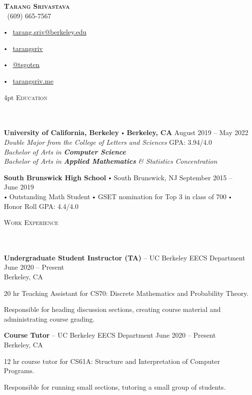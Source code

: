 \documentclass{article}
\newcommand{\contact}[3]{
\vspace*{3pt}
\begin{center}
{\LARGE \scshape {#1}}\\
\vspace{5pt}
#2 
\vspace{2pt}
#3
\end{center}
\vspace*{-8pt}
}
\newcommand{\header}[1]{{
\hspace*{-15pt}\vspace*{6pt} \textsc{#1}} \vspace*{-6pt} 
\lineunder
}
\newcommand{\lineunder}{
\vspace*{-8pt} \\ \hspace*{-18pt} 
\hrulefill \\
}
\newcommand{\school}[5]{\vspace*{2pt}%
\textbf{#1} \labelitemi #2 \hfill #3 \\ #4 \hfill #5
\vspace*{5pt}
}
\newcommand{\college}[7]{
\textbf{#1} \labelitemi \textbf{#2} \hfill #3 \\ #4 \hfill #7 \\ #5 \\ #6 \vspace*{5pt}
}
\newcommand{\employer}[4]{{
\vspace*{2pt}%
\textbf{#1} #2 \hfill #3\\ #4 \vspace*{2pt}}
}
\renewcommand{\labelitemi}{
$\vcenter{\hbox{\tiny$\bullet$}}$\hspace*{3pt}
}
\renewcommand{\labelitemii}{
$\vcenter{\hbox{\tiny$\bullet$}}$\hspace*{-3pt}
}
\newenvironment{bullet-list-minor}{
\begin{list}{\labelitemii}{\setlength\leftmargin{15pt} 
\topsep 0pt \itemsep -2pt}}{\vspace*{4pt}\end{list}
}
\begin{document}
\small
\smallskip
\vspace*{-44pt}

\contact{\textbf{Tarang Srivastava}}
{\faPhone\ (609) 665-7567 
\labelitemi \faEnvelope\ \href{mailto:tarang.sriv@berkeley.edu}{tarang.sriv@berkeley.edu}
\labelitemi \faLinkedin\ \href{https://www.linkedin.com/in/tarangsriv/}{tarangsriv}
\labelitemi \faGithub\ \href{https://github.com/tsgoten}{@tsgoten}%
\labelitemi \faLink\ \href{http://tarangsriv.me}{tarangsriv.me}
}

\vspace{4pt}
\header{Education}
    \college{University of California, Berkeley}{Berkeley, CA}{August 2019 -- May 2022}
    {\textit{Double Major from the College of Letters and Sciences}}
    {\textit{Bachelor of Arts in \textbf{Computer Science}}}
    {\textit{Bachelor of Arts in \textbf{Applied Mathematics} \& Statistics Concentration}}
    {GPA: 3.94/4.0}

    \school{South Brunswick High School}{South Brunswick, NJ}{September 2015 -- June 2019}
    {\labelitemi Outstanding Math Student \labelitemi GSET nomination for Top 3 in class of 700 \labelitemi Honor Roll}
    {GPA: 4.4/4.0}

\vspace*{4pt}%
\header{Work Experience}

    \employer{Undergraduate Student Instructor (TA)}
    {-- UC Berkeley EECS Department}{June 2020 -- Present}{Berkeley, CA}
	\begin{bullet-list-minor}
	\item 20 hr Teaching Assistant for CS70: Discrete Mathematics and Probability Theory. 
	\item Responsible for heading discussion sections, creating course material and administrating course grading.  
    \end{bullet-list-minor}

    \employer{Course Tutor}
    {-- UC Berkeley EECS Department}{June 2020 -- Present}{Berkeley, CA}
	\begin{bullet-list-minor}
    \item 12 hr course tutor for CS61A: Structure and Interpretation of Computer Programs. 
    \item Responsible for running small sections, tutoring a small group of students.
    \end{bullet-list-minor}

\end{document}
